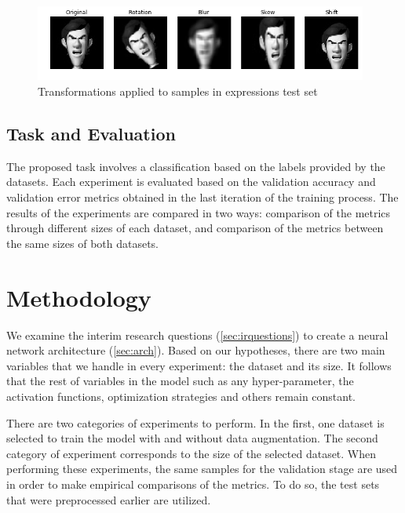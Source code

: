 \documentclass{article}
\begin{document}
\begin{figure}[!htb]
    \vskip 5mm
        \begin{center}
            \includegraphics[height=2.5cm]{augmented_expressions}
            \caption{Transformations applied to samples in expressions test set}
            \label{fig:4}
        \end{center}
    \vskip -5mm
\end{figure}

\subsection{Task and Evaluation}
\label{sec:evaluation}
The proposed task involves a classification based on the labels provided by the datasets. Each experiment is evaluated based on the validation accuracy and validation error metrics obtained in the last iteration of the training process. The results of the experiments are compared in two ways: comparison of the metrics through different sizes of each dataset, and comparison of the metrics between the same sizes of both datasets.

\section{Methodology}
\label{sec:methodology}
We examine the interim research questions (\ref{sec:irquestions}) to create a neural network architecture (\ref{sec:arch}). Based on our hypotheses, there are two main variables that we handle in every experiment: the dataset and its size. It follows that the rest of variables in the model such as any hyper-parameter, the activation functions, optimization strategies and others remain constant.

There are two categories of experiments to perform. In the first, one dataset is selected to train the model with and without data augmentation. The second category of experiment corresponds to the size of the selected dataset. When performing these experiments, the same samples for the validation stage are used in order to make empirical comparisons of the metrics. To do so, the test sets that were preprocessed earlier are utilized.
\end{document}
